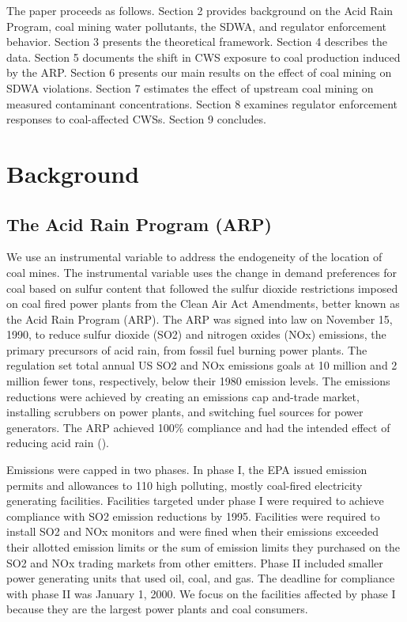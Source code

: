 \documentclass{article}
\begin{document}
The paper proceeds as follows. Section 2 provides background on the Acid Rain Program, coal mining water pollutants, the SDWA, and regulator enforcement behavior. Section 3 presents the theoretical framework. Section 4 describes the data. Section 5 documents the shift in CWS exposure to coal production induced by the ARP. Section 6 presents our main results on the effect of coal mining on SDWA violations. Section 7 estimates the effect of upstream coal mining on measured contaminant concentrations. Section 8 examines regulator enforcement responses to coal-affected CWSs. Section 9 concludes.

\section{Background}

\subsection{The Acid Rain Program (ARP)}

We use an instrumental variable to address the endogeneity of the location of coal mines. The instrumental variable uses the change in demand preferences for coal based on sulfur content that followed the sulfur dioxide restrictions imposed on coal fired power plants from the Clean Air Act Amendments, better known as the Acid Rain Program (ARP). The ARP was signed into law on November 15, 1990, to reduce sulfur dioxide (SO2) and nitrogen oxides (NOx) emissions, the primary precursors of acid rain, from fossil fuel burning power plants. The regulation set total annual US SO2 and NOx emissions goals at 10 million and 2 million fewer tons, respectively, below their 1980 emission levels. The emissions reductions were achieved by creating an emissions cap and-trade market, installing scrubbers on power plants, and switching fuel sources for power generators. The ARP achieved 100\% compliance and had the intended effect of reducing acid rain (\cite{lattanzio2022clean}). 

Emissions were capped in two phases. In phase I, the EPA issued emission permits and allowances to 110 high polluting, mostly coal-fired electricity generating facilities. Facilities targeted under phase I were required to achieve compliance with SO2 emission reductions by 1995. Facilities were required to install SO2 and NOx monitors and were fined when their emissions exceeded their allotted emission limits or the sum of emission limits they purchased on the SO2 and NOx trading markets from other emitters. Phase II included smaller power generating units that used oil, coal, and gas. The deadline for compliance with phase II was January 1, 2000. We focus on the facilities affected by phase I because they are the largest power plants and coal consumers.
\end{document}
